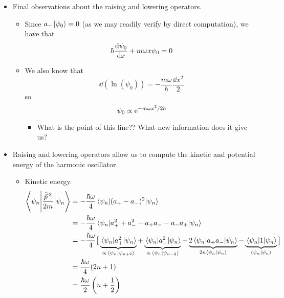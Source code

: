 \documentclass[../notes.tex]{subfiles}
\begin{document}
\begin{itemize}
\begin{equation*}
    \end{equation*}
    \item Final observations about the raising and lowering operators.
    \begin{itemize}
        \item Since $a_-\ket{\psi_0}=0$ (as we may readily verify by direct computation), we have that
        \begin{equation*}
            \hbar\dv{\psi_0}{x}+m\omega x\psi_0 = 0
        \end{equation*}
        \item We also know that
        \begin{equation*}
            \dd(\ln(\psi_0)) = -\frac{m\omega}{\hbar}\frac{\dd{x}^2}{2}
        \end{equation*}
        so
        \begin{equation*}
            \psi_0 \propto \e[-m\omega x^2/2\hbar]
        \end{equation*}
        \begin{itemize}
            \item What is the point of this line?? What new information does it give us?
        \end{itemize}
    \end{itemize}
    \item Raising and lowering operators allow us to compute the kinetic and potential energy of the harmonic oscillator.
    \begin{itemize}
        \item Kinetic energy.
        \begin{align*}
            \ev**{\frac{\hat{\vec{p}}{\,}^2}{2m}}{\psi_n} &= -\frac{\hbar\omega}{4}\ev{(a_+-a_-)^2}{\psi_n}\\
            &= -\frac{\hbar\omega}{4}\ev{a_+^2+a_-^2-a_+a_--a_-a_+}{\psi_n}\\
            &= -\frac{\hbar\omega}{4}\big[ \underbrace{\ev{a_+^2}{\psi_n}}_{\propto\,\braket{\psi_n}{\psi_{n+2}}}+\underbrace{\ev{a_-^2}{\psi_n}}_{\propto\,\braket{\psi_n}{\psi_{n-2}}}-\underbrace{2\ev{a_+a_-}{\psi_n}}_{2n\braket{\psi_n}}-\underbrace{\ev{1}{\psi_n}}_{\braket{\psi_n}} \big]\\
            &= \frac{\hbar\omega}{4}(2n+1)\\
            &= \frac{\hbar\omega}{2}\left( n+\frac{1}{2} \right)\\

\end{align*}
\end{itemize}
\end{itemize}
\end{document}
